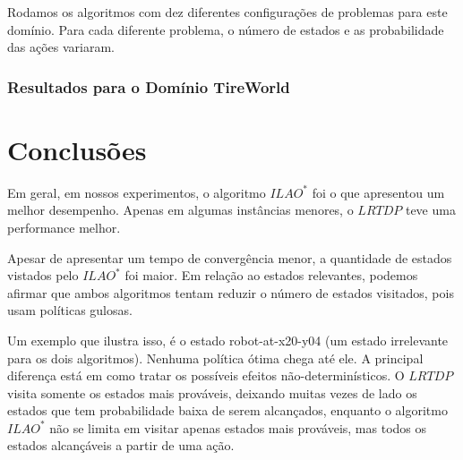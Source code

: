 \documentclass[12pt,a4paper]{article}
\begin{document}
Rodamos os algoritmos com dez diferentes configurações de problemas para este domínio. Para cada diferente problema, o número de estados e as probabilidade das ações variaram.

%


\subsubsection{Resultados para o Domínio TireWorld}
\label{resultsTireworld}




\section{Conclusões}\label{conclusao}


Em geral, em nossos experimentos, o algoritmo $ILAO^*$ foi o que apresentou um melhor desempenho. Apenas em algumas instâncias menores, o $LRTDP$ teve uma performance melhor. 

Apesar de apresentar um tempo de convergência menor, a quantidade de estados vistados pelo $ILAO^*$ foi maior. Em relação ao estados relevantes, podemos afirmar que ambos algoritmos tentam reduzir o número de estados visitados, pois usam políticas gulosas. 

Um exemplo que ilustra isso, é o estado robot-at-x20-y04 (um estado irrelevante para os dois algoritmos). Nenhuma política ótima chega até ele. A principal diferença está em como tratar os possíveis efeitos não-determinísticos. O $LRTDP$ visita somente os estados mais prováveis, deixando muitas vezes de lado os estados que tem probabilidade baixa de serem alcançados, enquanto o algoritmo $ILAO^*$ não se limita em visitar apenas estados mais prováveis, mas todos os estados alcançáveis a partir de uma ação.




\end{document}
